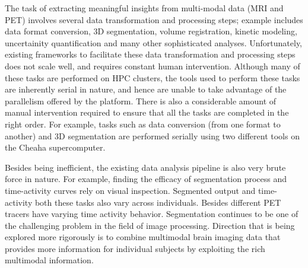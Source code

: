 \documentclass[11pt]{article}
\begin{document}
The task of extracting meaningful insights from multi-modal data (MRI and PET) involves several data transformation and processing steps;
example includes data format conversion, 3D segmentation, volume registration, kinetic modeling, uncertainity quantification and many other sophisticated analyses.
Unfortunately, existing frameworks to facilitate these data transformation and processing steps does not scale well, and requires constant human intervention.
Although many of these tasks are performed on HPC clusters, the tools used to perform these tasks are inherently serial in nature, and hence are unable to take advantage of the parallelism offered by the platform. There is also a considerable amount of manual intervention required to ensure that all the tasks are completed in the right order.
For example, tasks such as data conversion (from one format to another) and 3D segmentation are performed serially using two different tools on the Cheaha supercomputer.


Besides being inefficient, the existing data analysis pipeline is also very brute force in nature. 
For example, finding the efficacy of segmentation process and time-activity curves rely on visual inspection.
Segmented output and time-activity both these tasks also vary across individuals. Besides different PET tracers have varying time activity behavior.
Segmentation continues to be one of the challenging problem in the field of image processing. Direction that is being explored more rigorously is 
to combine multimodal brain imaging data that provides more information for individual subjects by exploiting the rich multimodal information.


\end{document}
